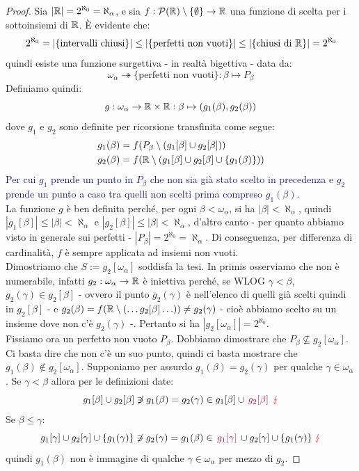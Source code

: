 \begin{proof}
	Sia $|\mathbb R| = 2^{\aleph_0} = \aleph_\alpha$, e sia $f : \mathcal{P}(\mathbb R) \setminus\{\emptyset\} \to \mathbb R$ una funzione di scelta per i sottoinsiemi di $\mathbb R$. È evidente che:
	\[ 2^{\aleph_0} = |\{\text{intervalli chiusi}\}| \leq |\{\text{perfetti non vuoti}\}| \leq |\{\text{chiusi di $\mathbb R$}\}| = 2^{\aleph_0}
		\]
	quindi esiste una funzione surgettiva - in realtà bigettiva - data da:
	\[ \omega_\alpha \twoheadrightarrow \{\text{perfetti non vuoti}\} : \beta \mapsto P_\beta
		\]
	Definiamo quindi:
	\[ g : \omega_\alpha \to \mathbb R \times \mathbb R : \beta \mapsto (g_1(\beta),g_2(\beta))
		\]
	dove $g_1$ e $g_2$ sono definite per ricorsione transfinita come segue:
	\begin{align*}
		&g_1(\beta) = f(P_\beta \setminus(g_1[\beta] \cup g_2[\beta])) \\
		&g_2(\beta) = f(\mathbb R \setminus (g_1[\beta] \cup g_2[\beta] \cup \{g_1(\beta)\}))
	\end{align*}
	\textcolor{MidnightBlue}{Per cui $g_1$ prende un punto in $P_\beta$ che non sia già stato scelto in precedenza e $g_2$ prende un punto a caso tra quelli non scelti prima compreso $g_1(\beta)$.}\\
	La funzione $g$ è ben definita perché, per ogni $\beta < \omega_\alpha$, si ha $|\beta| < \aleph_\alpha$, quindi $|g_1[\beta]| \leq |\beta| < \aleph_\alpha$ e $|g_2[\beta]|\leq |\beta| < \aleph_\alpha$,
	d'altro canto - per quanto abbiamo visto in generale sui perfetti - $|P_\beta| = 2^{\aleph_0} = \aleph_\alpha$. Di conseguenza, per differenza di cardinalità, $f$ è sempre applicata ad insiemi non vuoti.\\
	Dimostriamo che $S := g_2[\omega_\alpha]$ soddisfa la tesi. In primis osserviamo che non è numerabile, infatti $g_2 : \omega_\alpha \to \mathbb R$ è iniettiva perché, se WLOG $\gamma < \beta$, $g_2(\gamma) \in g_2[\beta]$ - ovvero il punto $g_2(\gamma)$ è nell'elenco di quelli già scelti quindi in $g_2[\beta]$ -
	e $g_2(\beta) = f(\mathbb R \setminus (\ldots g_2[\beta] \ldots)) \ne g_2(\gamma)$ - cioè abbiamo scelto su un insieme dove non c'è $g_2(\gamma)$ -.
	Pertanto si ha $|g_2[\omega_\alpha]| = 2^{\aleph_0}$.\\
	Fissiamo ora un perfetto non vuoto $P_\beta$. Dobbiamo dimostrare che $P_\beta \not\subseteq g_2[\omega_\alpha]$. Ci basta dire che non c'è un suo punto, quindi ci basta mostrare che $g_1(\beta) \not \in g_2[\omega_\alpha]$.
	Supponiamo per assurdo $g_1(\beta) = g_2(\gamma)$ per qualche $\gamma \in \omega_\alpha$. Se $\gamma < \beta$ allora per le definizioni date:
	\[  g_1[\beta] \cup g_2[\beta] \not\ni g_1(\beta) = g_2(\gamma) \in g_1[\beta] \cup \,\textcolor{purple}{g_2[\beta]}\, \;\textcolor{red}{\lightning}
		\]
	Se $\beta \leq \gamma$:
	\[ g_1[\gamma] \cup g_2[\gamma] \cup \{g_1(\gamma)\} \not\ni g_2(\gamma) = g_1(\beta) \in \,\textcolor{purple}{g_1[\gamma]}\, \cup g_2[\gamma] \cup \{g_1(\gamma)\} \;\textcolor{red}{\lightning}
		\]
	quindi $g_1(\beta)$ non è immagine di qualche $\gamma \in \omega_\alpha$ per mezzo di $g_2$.
\end{proof}


